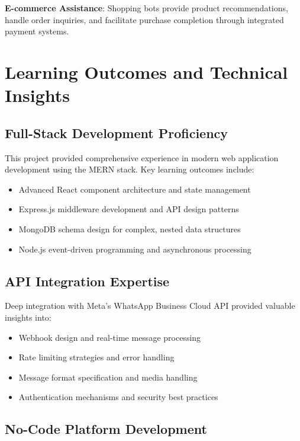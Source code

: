 \documentclass[conference]{IEEEtran}
\begin{document}
\textbf{E-commerce Assistance}: Shopping bots provide product recommendations, handle order inquiries, and facilitate purchase completion through integrated payment systems.

\section{Learning Outcomes and Technical Insights}

\subsection{Full-Stack Development Proficiency}

This project provided comprehensive experience in modern web application development using the MERN stack. Key learning outcomes include:

\begin{itemize}
\item Advanced React component architecture and state management
\item Express.js middleware development and API design patterns
\item MongoDB schema design for complex, nested data structures
\item Node.js event-driven programming and asynchronous processing
\end{itemize}

\subsection{API Integration Expertise}

Deep integration with Meta's WhatsApp Business Cloud API provided valuable insights into:

\begin{itemize}
\item Webhook design and real-time message processing
\item Rate limiting strategies and error handling
\item Message format specification and media handling
\item Authentication mechanisms and security best practices
\end{itemize}

\subsection{No-Code Platform Development}
\end{document}
